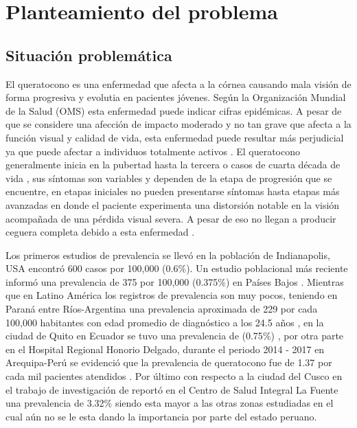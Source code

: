 \tableofcontents
\newpage

\section{Planteamiento del problema}
\subsection{Situación problemática}
El queratocono es una enfermedad que afecta a la córnea causando mala visión de forma progresiva y evolutia en pacientes jóvenes. Según la Organización Mundial de la Salud (OMS) esta enfermedad puede indicar cifras epidémicas. A pesar de que se considere una afección de impacto moderado y no tan grave que afecta a la función visual y calidad de vida, esta enfermedad puede resultar más perjudicial ya que puede afectar a individuos totalmente activos \cite{thalasselis1988keratoconus}. El queratocono generalmente inicia en la pubertad hasta la tercera o casos de cuarta década de vida \cite{althomali2018prevalence}, sus síntomas son variables y dependen de la etapa de progresión que se encuentre, en etapas iniciales no pueden presentarse síntomas hasta etapas más avanzadas en donde el paciente experimenta una distorsión notable en la visión acompañada de una pérdida visual severa. A pesar de eso no llegan a producir ceguera completa debido a esta enfermedad \cite{rabinowitz1998keratoconus}. 

Los primeros estudios de prevalencia se llevó en la población de Indianapolis, USA encontró 600 casos por 100,000 (0.6$\%$). Un estudio poblacional más reciente informó una prevalencia de 375 por 100,000 (0.375$\%$) en Países Bajos \cite{godefrooij2017age}. Mientras que en Latino América  los registros de prevalencia son muy pocos, teniendo en Paraná entre Ríos-Argentina una prevalencia aproximada de 229 por cada 100,000 habitantes con edad promedio de diagnóstico a los 24.5 años \cite{pussetto2011alta}, en la ciudad de Quito en Ecuador se tuvo una prevalencia de (0.75$\%$) \cite{mansfield2017queratocono}, por otra parte en el Hospital Regional Honorio Delgado, durante el periodo 2014 - 2017 en Arequipa-Perú se evidenció que la prevalencia de queratocono fue de 1.37 por cada mil pacientes atendidos \cite{ramos2018prevalencia}. Por último con respecto a la ciudad del Cusco en el trabajo de investigación de \cite{samaniego2023prevalencia} reportó en el Centro de Salud Integral La Fuente una prevalencia de 3.32$\%$ siendo esta mayor a las otras zonas estudiadas en el cual aún no se le esta dando la importancia por parte del estado peruano.

